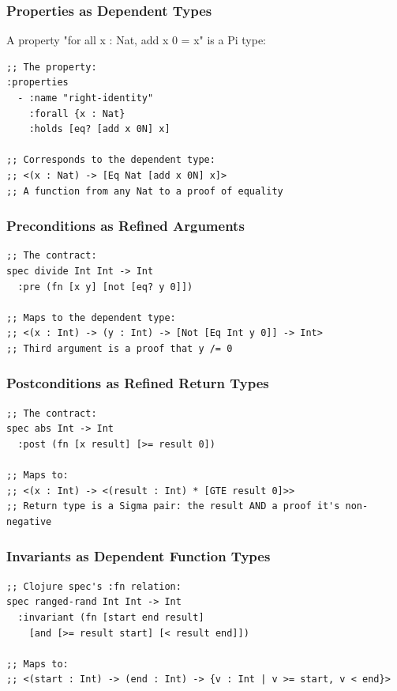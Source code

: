 \documentclass[11pt]{article}
\begin{document}
\subsubsection{Properties as Dependent Types}
\label{sec:orgf369ca8}

A property "for all x : Nat, add x 0 = x" is a Pi type:

\begin{verbatim}
;; The property:
:properties
  - :name "right-identity"
    :forall {x : Nat}
    :holds [eq? [add x 0N] x]

;; Corresponds to the dependent type:
;; <(x : Nat) -> [Eq Nat [add x 0N] x]>
;; A function from any Nat to a proof of equality
\end{verbatim}
\subsubsection{Preconditions as Refined Arguments}
\label{sec:org43938ab}

\begin{verbatim}
;; The contract:
spec divide Int Int -> Int
  :pre (fn [x y] [not [eq? y 0]])

;; Maps to the dependent type:
;; <(x : Int) -> (y : Int) -> [Not [Eq Int y 0]] -> Int>
;; Third argument is a proof that y /= 0
\end{verbatim}
\subsubsection{Postconditions as Refined Return Types}
\label{sec:org96f074c}

\begin{verbatim}
;; The contract:
spec abs Int -> Int
  :post (fn [x result] [>= result 0])

;; Maps to:
;; <(x : Int) -> <(result : Int) * [GTE result 0]>>
;; Return type is a Sigma pair: the result AND a proof it's non-negative
\end{verbatim}
\subsubsection{Invariants as Dependent Function Types}
\label{sec:org39e4f41}

\begin{verbatim}
;; Clojure spec's :fn relation:
spec ranged-rand Int Int -> Int
  :invariant (fn [start end result]
    [and [>= result start] [< result end]])

;; Maps to:
;; <(start : Int) -> (end : Int) -> {v : Int | v >= start, v < end}>
\end{verbatim}
\end{document}
